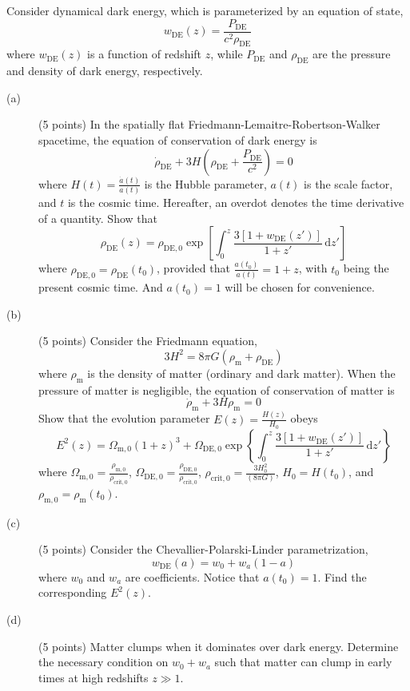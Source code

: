 Consider dynamical dark energy, which is parameterized by an equation of
state,
\[ w_{\mathrm{DE}}(z) = \frac{P_{\mathrm{DE}}}{c^2 \rho_{\mathrm{DE}}} \]
where $w_{\mathrm{DE}}(z)$ is a function of redshift $z$, while
$P_{\mathrm{DE}}$ and $\rho_{\mathrm{DE}}$ are the pressure and density of
dark energy, respectively.

\begin{description}
\item[(a)] (5 points) In the spatially flat Friedmann-Lemaitre-Robertson-Walker
  spacetime, the equation of conservation of dark energy is
  \[ \dot{\rho}_{\mathrm{DE}} + 3H\left(\rho_{\mathrm{DE}}
     + \frac{P_{\mathrm{DE}}}{c^2}\right) = 0 \]
  where $H(t) = \frac{\dot{a}(t)}{a(t)}$ is the Hubble parameter, $a(t)$ is
  the scale factor, and $t$ is the cosmic time. Hereafter, an overdot denotes
  the time derivative of a quantity. Show that
  \[ \rho_{\mathrm{DE}}(z) = \rho_{\mathrm{DE},0}
     \exp\left[\int_0^z \frac{3\left[1 + w_{\mathrm{DE}}(z')\right]}{1+z'}
     \,\mathrm{d}z'\right] \]
  where $\rho_{\mathrm{DE},0} = \rho_{\mathrm{DE}}(t_0)$, provided that
  $\frac{a(t_0)}{a(t)} = 1 + z$, with $t_0$ being the present cosmic time. And
  $a(t_0) = 1$ will be chosen for convenience.
\item[(b)] (5 points) Consider the Friedmann equation,
  \[ 3H^2 = 8\pi G\left(\rho_{\mathrm{m}} + \rho_{\mathrm{DE}}\right) \]
  where $\rho_{\mathrm{m}}$ is the density of matter (ordinary and dark
  matter). When the pressure of matter is negligible, the equation of
  conservation of matter is
  \[ \dot{\rho}_{\mathrm{m}} + 3H\rho_{\mathrm{m}} = 0 \]
  Show that the evolution parameter $E(z) = \frac{H(z)}{H_0}$ obeys
  \[ E^2(z) = \Omega_{\mathrm{m},0}(1+z)^3 + \Omega_{\mathrm{DE},0}
     \exp\left\{\int_0^z \frac{3\left[1 + w_{\mathrm{DE}}(z')\right]}{1+z'}
     \,\mathrm{d}z'\right\} \]
  where $\Omega_{\mathrm{m},0} = \frac{\rho_{\mathrm{m},0}}{\rho_{\mathrm{crit},0}}$,
  $\Omega_{\mathrm{DE},0} = \frac{\rho_{\mathrm{DE},0}}{\rho_{\mathrm{crit},0}}$,
  $\rho_{\mathrm{crit},0} = \frac{3H_0^2}{(8\pi G)}$, $H_0 = H(t_0)$, and
  $\rho_{\mathrm{m},0} = \rho_{\mathrm{m}}(t_0)$.
\item[(c)] (5 points) Consider the Chevallier-Polarski-Linder parametrization,
  \[ w_{\mathrm{DE}}(a) = w_0 + w_a(1 - a) \]
  where $w_0$ and $w_a$ are coefficients. Notice that $a(t_0) = 1$. Find the
  corresponding $E^2(z)$.
\item[(d)] (5 points) Matter clumps when it dominates over dark energy.
  Determine the necessary condition on $w_0 + w_a$ such that matter can clump
  in early times at high redshifts $z \gg 1$.
\end{description}
